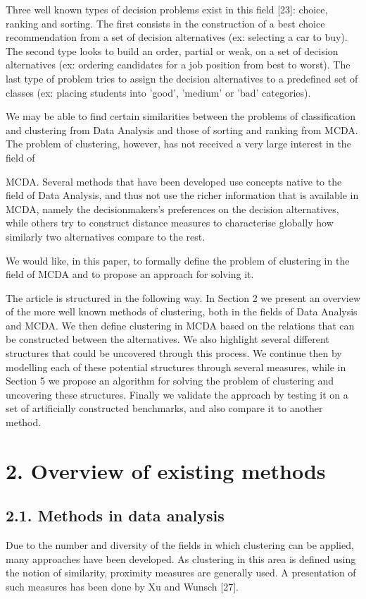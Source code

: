 \documentclass[10pt]{article}
\begin{document}
Three well known types of decision problems exist in this field [23]: choice, ranking and sorting. The first consists in the construction of a best choice recommendation from a set of decision alternatives (ex: selecting a car to buy). The second type looks to build an order, partial or weak, on a set of decision alternatives (ex: ordering candidates for a job position from best to worst). The last type of problem tries to assign the decision alternatives to a predefined set of classes (ex: placing students into 'good', 'medium' or 'bad' categories).

We may be able to find certain similarities between the problems of classification and clustering from Data Analysis and those of sorting and ranking from MCDA. The problem of clustering, however, has not received a very large interest in the field of

MCDA. Several methods that have been developed use concepts native to the field of Data Analysis, and thus not use the richer information that is available in MCDA, namely the decisionmakers's preferences on the decision alternatives, while others try to construct distance measures to characterise globally how similarly two alternatives compare to the rest.

We would like, in this paper, to formally define the problem of clustering in the field of MCDA and to propose an approach for solving it.

The article is structured in the following way. In Section 2 we present an overview of the more well known methods of clustering, both in the fields of Data Analysis and MCDA. We then define clustering in MCDA based on the relations that can be constructed between the alternatives. We also highlight several different structures that could be uncovered through this process. We continue then by modelling each of these potential structures through several measures, while in Section 5 we propose an algorithm for solving the problem of clustering and uncovering these structures. Finally we validate the approach by testing it on a set of artificially constructed benchmarks, and also compare it to another method.

\section*{2. Overview of existing methods}
\subsection*{2.1. Methods in data analysis}
Due to the number and diversity of the fields in which clustering can be applied, many approaches have been developed. As clustering in this area is defined using the notion of similarity, proximity measures are generally used. A presentation of such measures has been done by Xu and Wunsch [27].
\end{document}
